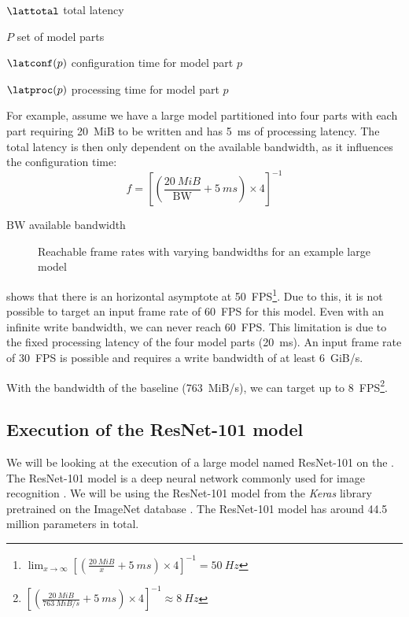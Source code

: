 \begin{eqexpl}[15mm]
    \item{$\lattotal$} total latency
    \item{$P$} set of model parts
    \item{$\latconf(p)$} configuration time for model part $p$
    \item{$\latproc(p)$} processing time for model part $p$
\end{eqexpl}

For example, assume we have a large model partitioned into four parts with each part requiring \SI{20}{MiB} to be written and has \SI{5}{ms} of processing latency.
The total latency is then only dependent on the available bandwidth, as it influences the configuration time:
\begin{equation*}
    f = \left[ \left( \frac{\SI{20}{MiB}}{\textrm{BW}} + \SI{5}{ms} \right) \times 4 \right]^{-1}
\end{equation*}

\begin{eqexpl}[15mm]
    \item{$\textrm{BW}$} available bandwidth
\end{eqexpl}

\begin{figure}
    \centering
    
    \caption{Reachable frame rates with varying bandwidths for an example large model}
    \label{fig:large_model_bandwidth_analysis_example}
\end{figure}

 shows that there is an horizontal asymptote at \SI{50}{FPS}\footnote{ $\lim_{x \to \infty} \left[ \left( \frac{\SI{20}{MiB}}{x} + \SI{5}{ms} \right) \times 4 \right]^{-1} = \SI{50}{Hz}$}.
Due to this, it is not possible to target an input frame rate of \SI{60}{FPS} for this model.
Even with an infinite write bandwidth, we can never reach \SI{60}{FPS}.
This limitation is due to the fixed processing latency of the four model parts (\SI{20}{ms}).
An input frame rate of \SI{30}{FPS} is possible and requires a write bandwidth of at least \SI{6}{GiB/s}.

With the bandwidth of the baseline \confignoc{} (\SI{763}{MiB/s}), we can target up to \SI{8}{FPS}\footnote{$\left[ \left( \frac{\SI{20}{MiB}}{\SI{763}{MiB/s}} + \SI{5}{ms} \right) \times 4 \right]^{-1} \approx \SI{8}{Hz}$}.

\subsection{Execution of the ResNet-101 model}
We will be looking at the execution of a large model named ResNet-101 on the \graicore{}.
The ResNet-101 model is a deep neural network commonly used for image recognition \autocite{heDeepResidualLearning2015}.
We will be using the ResNet-101 model from the \textit{Keras} library \cite{KerasDocumentationResNet} pretrained on the ImageNet database \cite{russakovskyImageNetLargeScale2014}.
The ResNet-101 model has around 44.5 million parameters in total.

